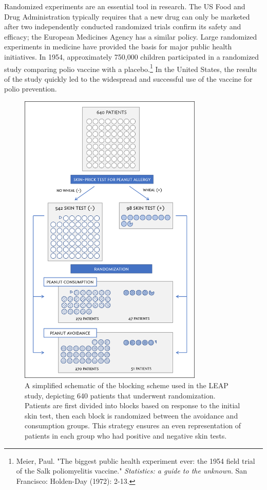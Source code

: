 Randomized experiments are an essential tool in research. The US Food and Drug Administration typically requires that a new drug can only be marketed after two independently conducted randomized trials confirm its safety and efficacy; the European Medicines Agency has a similar policy. Large randomized experiments in medicine have provided the basis for major public health initiatives. In 1954, approximately 750,000 children participated in a randomized study comparing polio vaccine with a placebo.\footnote{Meier, Paul. "The biggest public health experiment ever: the 1954 field trial of the Salk poliomyelitis vaccine." \textit{Statistics: a guide to the unknown}. San Francisco: Holden-Day (1972): 2-13.}  In the United States, the results of the study quickly led to the widespread and successful use of the vaccine for polio prevention.

	\begin{figure}
		\centering
		\includegraphics[width=0.78\textwidth]{ch_intro_to_data_oi_biostat/figures/leapBlocking/leapBlocking.png}
		\caption{A simplified schematic of the blocking scheme used in the LEAP study, depicting 640 patients that underwent randomization. Patients are first divided into blocks based on response to the initial skin test, then each block is randomized between the avoidance and consumption groups. This strategy ensures an even representation of patients in each group who had positive and negative skin tests.}
		\label{leapBlocking}
	\end{figure}

